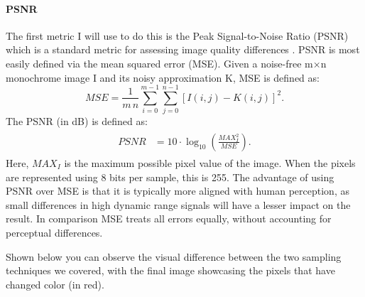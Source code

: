 \documentclass[12pt]{article}
\begin{document}
\paragraph{PSNR} The first metric I will use to do this is the Peak Signal-to-Noise Ratio (PSNR) which is a standard metric for assessing image quality differences \cite{imagequality}. PSNR is most easily defined via the mean squared error (MSE). Given a noise-free m×n monochrome image I and its noisy approximation K, MSE is defined as:
\[
    {\displaystyle {\mathit {MSE}}={\frac {1}{m\,n}}\sum _{i=0}^{m-1}\sum _{j=0}^{n-1}[I(i,j)-K(i,j)]^{2}.}
\]
The PSNR (in dB) is defined as:
\[
    \begin{array}{c} {\displaystyle {\begin{aligned}{\mathit {PSNR}}&=10\cdot \log _{10}\left({\frac {{\mathit {MAX}}_{I}^{2}}{\mathit {MSE}}}\right).\end{aligned}}} \end{array}
\]
Here, $MAX_I$ is the maximum possible pixel value of the image. When the pixels are represented using 8 bits per sample, this is 255. The advantage of using PSNR over MSE is that it is typically more aligned with human perception, as small differences in high dynamic range signals will have a lesser impact on the result. In comparison MSE treats all errors equally, without accounting for perceptual differences.

Shown below you can observe the visual difference between the two sampling techniques we covered, with the final image showcasing the pixels that have changed color (in red).
\end{document}
